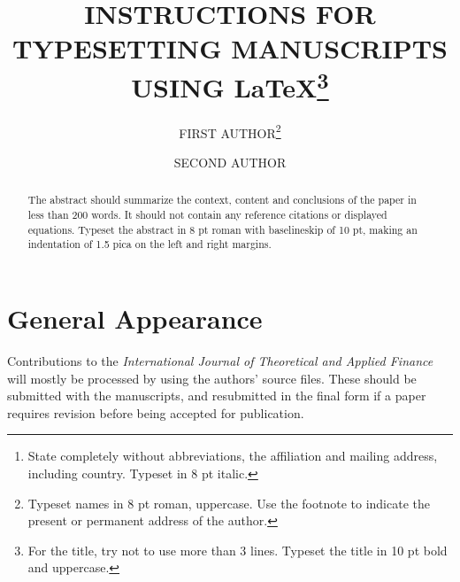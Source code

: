 \documentclass{ws-ijtaf}
\begin{document}

\catchline{}{}{}{}{}

\title{INSTRUCTIONS FOR TYPESETTING MANUSCRIPTS \\
USING \LaTeX\footnote{For the title, try not to
use more than 3 lines. Typeset the title in 10 pt bold and uppercase.}
}

\author{FIRST AUTHOR\footnote{
Typeset names in 8 pt roman, uppercase. Use the footnote to indicate the
present or permanent address of the author.}}

\address{University Department, University Name, Address\\
City, State ZIP/Zone,Country\,\footnote{State completely without
abbreviations, the affiliation and mailing address, including country.
Typeset in 8 pt italic.}\\
 }

\author{SECOND AUTHOR}

\address{Group, Laboratory, Address\\
City, State ZIP/Zone, Country\\
author\_id@domain\_name }

\maketitle

\begin{history}
\end{history}

\begin{abstract}
The abstract should summarize the context, content and conclusions of
the paper in less than 200 words. It should not contain any reference
citations or displayed equations. Typeset the abstract in 8 pt roman
with baselineskip of 10 pt, making an indentation of 1.5 pica on the
left and right margins.
\end{abstract}


\section{General Appearance}	
Contributions to the {\it International Journal of Theoretical and
Applied Finance} will mostly be processed by using the authors' source
files. These should be submitted with the manuscripts, and resubmitted
in the final form if a paper requires revision before being accepted
for publication.
\end{document}
